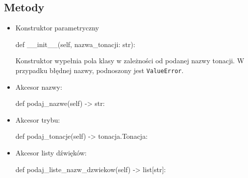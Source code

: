\documentclass[dokumentacja.tex]{subfiles}
\begin{document}
\subsection{Metody}
\begin{itemize}
    \item Konstruktor parametryczny
        \begin{python}
    def __init__(self, nazwa_tonacji: str):
        \end{python}
        Konstruktor wypełnia pola klasy w zależności od podanej nazwy tonacji. W przypadku błędnej nazwy, podnoszony jest \texttt{ValueError}.

    \item Akcesor nazwy:
          \begin{python}
    def podaj_nazwe(self) -> str:
          \end{python}

    \item Akcesor trybu:
        \begin{python}
    def podaj_tonacje(self) -> tonacja.Tonacja:
        \end{python}

    \item Akcesor listy dźwięków:
    \begin{python}
    def podaj_liste_nazw_dzwiekow(self) -> list[str]:
    \end{python}
\end{itemize}
\end{document}
